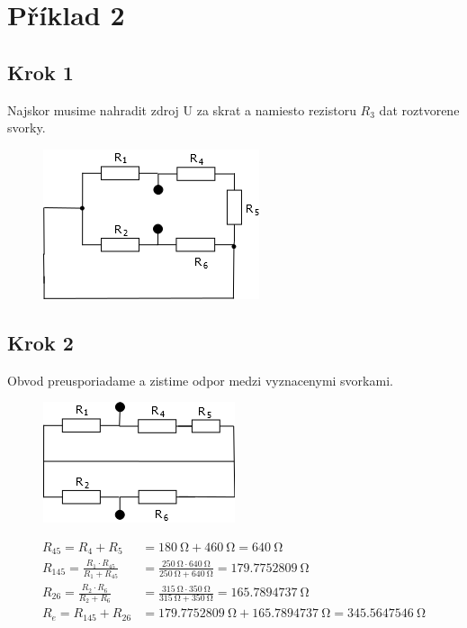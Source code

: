 \section{Příklad 2}

\subsection{Krok 1}
Najskor musime nahradit zdroj U za skrat a namiesto rezistoru $R_3$ dat roztvorene svorky.

\begin{figure}[!h]
    \centering
    \includegraphics[width=0.5\linewidth]{pr2/1.png}
\end{figure}

\subsection{Krok 2}
Obvod preusporiadame a zistime odpor medzi vyznacenymi svorkami.

\begin{figure}[!h]
    \centering
    \includegraphics[width=0.5\linewidth]{pr2/2.png}
\end{figure}

\begin{align*}
    R_{45} = R_4 + R_5 &= \SI{180}{\ohm} + \SI{460}{\ohm} = \SI{640}{\ohm}\\
    R_{145} = \frac{R_1 \cdot R_{45}}{R_1 + R_{45}} &= \frac{\SI{250}{\ohm} \cdot \SI{640}{\ohm}}{\SI{250}{\ohm} + \SI{640}{\ohm}} = \SI{179.7752809}{\ohm}\\
    R_{26} = \frac{R_2 \cdot R_6}{R_2 + R_6} &= \frac{\SI{315}{\ohm} \cdot \SI{350}{\ohm}}{\SI{315}{\ohm} + \SI{350}{\ohm}} = \SI{165.7894737}{\ohm}\\
    R_e = R_{145} + R_{26} &= \SI{179.7752809}{\ohm} + \SI{165.7894737}{\ohm} = \SI{345.5647546}{\ohm}\\
\end{align*}

